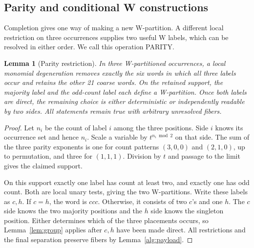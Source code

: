 \documentclass[11pt]{article}
\numberwithin{equation}{section}
\newtheorem{lemma}[theorem]{Lemma}
\theoremstyle{definition}
\theoremstyle{remark}
\begin{document}
\subsection{Parity and conditional W constructions}
\label{alg:parity-section}

Completion gives one way of making a new W-partition.  A different local
restriction on three occurrences supplies two useful W labels, which can
be resolved in either order.  We call this operation PARITY.

\begin{lemma}[Parity restriction]
\label{alg:parity}
In three W-partitioned occurrences, a local monomial degeneration removes
exactly the six words in which all three labels occur and retains the
other 21 coarse words.  On the retained support, the majority label and
the odd-count label each define a W-partition.  Once both labels are direct,
the remaining choice is either deterministic or independently readable by
two sides.  All statements remain true with arbitrary unresolved fibers.
\end{lemma}
\begin{proof}
Let \(n_i\) be the count of label \(i\) among the three positions.
Side \(i\) knows its occurrence set and hence \(n_i\).
Scale a variable by \(t^{n_i\bmod2}\) on that side.
The sum of the three parity exponents is one for count patterns
\((3,0,0)\) and \((2,1,0)\), up to permutation, and three for
\((1,1,1)\).  Division by \(t\) and passage to the limit gives the
claimed support.

On this support exactly one label has count at least two, and exactly one
has odd count.  Both are local unary tests, giving the two W-partitions.
Write these labels as \(c,h\).  If \(c=h\), the word is \(ccc\).
Otherwise, it consists of two \(c\)'s and one \(h\).  The \(c\) side
knows the two majority positions and the \(h\) side knows the singleton
position.  Either determines which of the three placements occurs, so
Lemma~\ref{lem:group} applies after \(c,h\) have been made direct.
All restrictions and the final separation preserve fibers by
Lemma~\ref{alg:payload}.
\end{proof}
\end{document}
